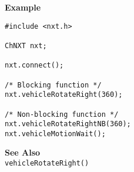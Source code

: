 \noindent
{\bf Example}
\begin{lstlisting}
#include <nxt.h>

ChNXT nxt;

nxt.connect();

/* Blocking function */
nxt.vehicleRotateRight(360);

/* Non-blocking function */
nxt.vehicleRotateRightNB(360);
nxt.vehicleMotionWait();
\end{lstlisting}

\noindent
{\bf See Also}\\
\texttt{vehicleRotateRight()}

